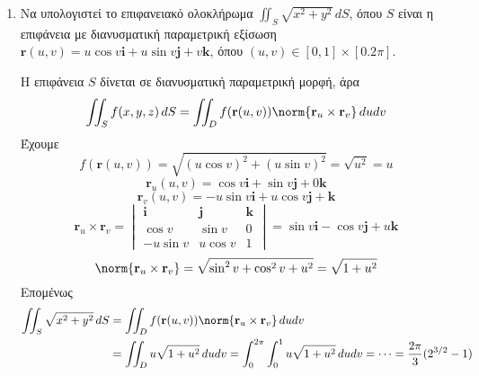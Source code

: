 







\begin{center}
  \minibox{\bfseries\large \textcolor{Col1}{Ασκήσεις Επιφανειακό Ολοκλήρωμα (Ιου
  είδους)}} 
\end{center} 

\vspace{\baselineskip} 

\begin{enumerate}
  \item Να υπολογιστεί το επιφανειακό ολοκλήρωμα $ \iint_{S} \sqrt{x^{2}+y^{2}} \,{dS} $,
    όπου $ S $ είναι η επιφάνεια με διανυσματική παραμετρική εξίσωση $ \mathbf{r}(u,v) =
    u \cos{v}\mathbf{i}+ u \sin{v}\mathbf{j}+ v\mathbf{k} $, όπου $ (u,v) \in
    [0,1]\times[0.2 \pi] $. 
    \begin{solution}
      Η επιφάνεια $S$ δίνεται σε διανυσματική παραμετρική μορφή, άρα 
      \[
        \iint_{S} f(x,y,z) \,{dS} 
        = \iint_{D} f(\mathbf{r}(u,v)) \norm{\mathbf{r}_{u}\times \mathbf{r}_{v}} \, dudv
      \]
      Έχουμε
      \[
        f(\mathbf{r}(u,v)) = \sqrt{(u \cos{v} )^{2}+(u \sin{v} )^{2}} = \sqrt{u^{2}} = u 
      \] 
      \[
        \mathbf{r}_{u}(u,v) = \cos{v}\mathbf{i}+ \sin{v}\mathbf{j}+0\mathbf{k}
      \] 
      \[
        \mathbf{r}_{v}(u,v) = -u \sin{v}\mathbf{i}+u \cos{v}\mathbf{j}+\mathbf{k}  
      \] 
      \[
        \mathbf{r}_{u}\times \mathbf{r}_{v} = 
        \begin{vmatrix*}
          \mathbf{i} & \mathbf{j} & \mathbf{k} \\
          \cos{v} & \sin{v} & 0 \\
          -u \sin{v} & u \cos{v} & 1
        \end{vmatrix*} = \sin{v} \mathbf{i} - \cos{v} \mathbf{j} + u \mathbf{k}
      \]
      \[
        \norm{\mathbf{r}_{u}\times \mathbf{r}_{v}} = \sqrt{\sin^{2}{v} +
        \cos^{2}{v}+u^{2}} = \sqrt{1 + u^{2}} 
      \] 
      Επομένως
      \begin{align*}
        \iint_{S} \sqrt{x^{2}+y^{2}} \,{dS} 
        &= \iint_{D} f(\mathbf{r}(u,v)) \norm{\mathbf{r}_{u}\times \mathbf{r}_{v}} 
        \,{du} {dv} \\
        &= \iint_{D} u \sqrt{1+u^{2}} \,{du}{dv} = \int _{0}^{2 \pi} \int _{0}^{1} u
        \sqrt{1+u^{2}} \,{du} {dv} = \cdots = \frac{2 \pi}{3} (2^{3/2}-1)
      \end{align*}
    \end{solution}


\end{enumerate}
